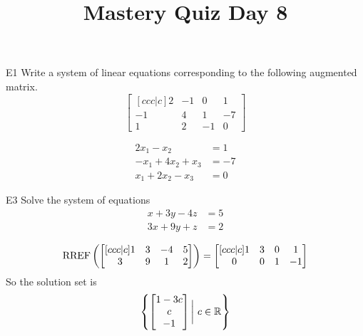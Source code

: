 \documentclass{sbgLAquiz}
\title{Mastery Quiz Day 8 }
\begin{document}
\begin{problem}{E1}
Write a system of linear equations corresponding to the following
augmented matrix.
\[
\begin{bmatrix}[ccc|c]
2 & -1 & 0 & 1  \\
-1 & 4 & 1 & -7  \\
1 & 2 & -1 & 0
\end{bmatrix}
\]
\end{problem}
\begin{solution}
\begin{align*}
2x_1-x_2&=1 \\
-x_1+4x_2+x_3&=-7 \\
x_1+2x_2-x_3 &= 0
\end{align*}
\end{solution}

\begin{problem}{E3}
Solve the system of equations
\begin{align*}
x+3y-4z &= 5 \\
3x+9y+z &= 2
\end{align*}
\end{problem}
\begin{solution}
$$\operatorname{RREF} \left(\begin{bmatrix}[ccc|c] 1 & 3 & -4 & 5 \\ 3 & 9 & 1 & 2 \end{bmatrix} \right) = \begin{bmatrix}[ccc|c] 1 & 3 & 0 & 1 \\ 0 & 0 & 1 & -1\end{bmatrix}$$
So the solution set is
$$\left\{ \begin{bmatrix} 1-3c \\ c \\ -1 \end{bmatrix} \bigg|\ c \in \mathbb{R} \right\}$$
\end{solution}
\end{document}
